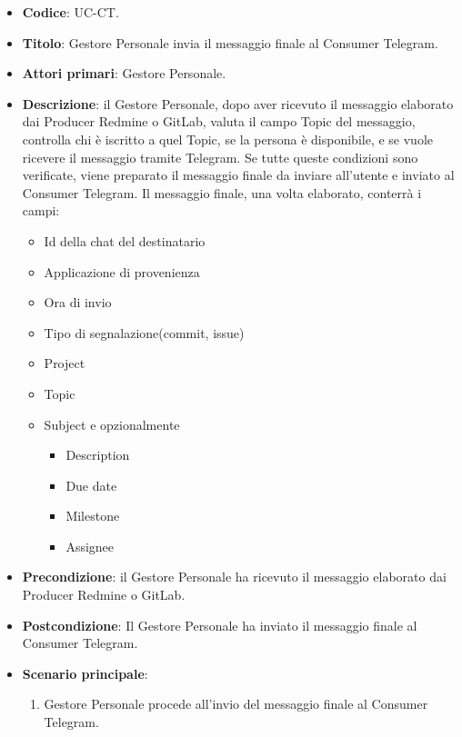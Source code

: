 	\begin{itemize}
		\item \textbf{Codice}: UC\theuccount-CT.
		\item \textbf{Titolo}: Gestore Personale invia il messaggio finale al Consumer Telegram.
		\item \textbf{Attori primari}: Gestore Personale.
		\item \textbf{Descrizione}: il Gestore Personale, dopo aver ricevuto il messaggio elaborato dai Producer Redmine o GitLab,
		valuta il campo Topic del messaggio, controlla chi è iscritto a quel Topic, se la persona è disponibile, e se vuole ricevere
		il messaggio tramite Telegram. Se tutte queste condizioni sono verificate, viene preparato il messaggio finale da inviare
		all'utente e inviato al Consumer Telegram. Il messaggio finale, una volta elaborato, conterrà i campi:
		\begin{itemize}
			\item Id della chat del destinatario
			\item Applicazione di provenienza
			\item Ora di invio
			\item Tipo di segnalazione(commit, issue)
			\item Project
			\item Topic
			\item Subject e opzionalmente
		 	\begin{itemize}
				\item Description
				\item Due date
				\item Milestone
				\item Assignee
			\end{itemize}
		\end{itemize}
		\item \textbf{Precondizione}: il Gestore Personale ha ricevuto il messaggio elaborato dai Producer Redmine o GitLab.
		\item \textbf{Postcondizione}: Il Gestore Personale ha inviato il messaggio finale al Consumer Telegram.
		\item \textbf{Scenario principale}: 
		\begin{enumerate}
			\item Gestore Personale procede all'invio del messaggio finale al Consumer Telegram.
		\end{enumerate}
		
	\end{itemize}